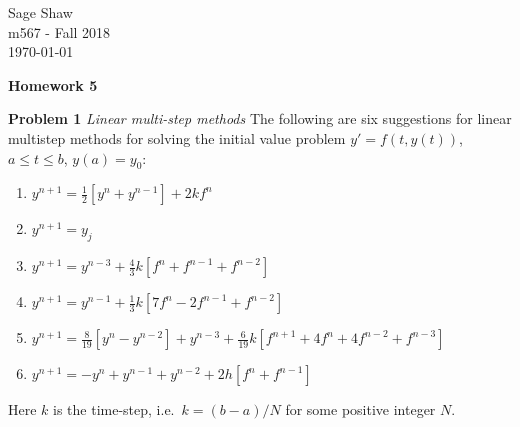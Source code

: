 \documentclass[12pt]{article}
\newcommand{\problem}[1]{\hspace{-4 ex} \large \textbf{Problem #1} }
\begin{document}
	\thispagestyle{empty}
	
	\begin{flushright}
		Sage Shaw \\
		m567 - Fall 2018 \\
		\today
	\end{flushright}
	
\begin{center}{\large \textbf{Homework 5}}\end{center}
\bigbreak

\hspace{-.5 ex}\problem{1} \emph{Linear multi-step methods} The following are six suggestions for linear multistep methods for solving
the initial value problem $y'=f(t,y(t))$, $a \leq t \leq b$, $y(a) = y_0$:
\begin{enumerate}[label=(\alph*)]
	\item $y^{n+1} = \frac{1}{2}\left[y^{n} + y^{n-1}\right] + 2kf^{n}$
	\item $y^{n+1} = y_j$
	\item $y^{n+1} = y^{n-3} + \frac{4}{3}k\left[f^{n} + f^{n-1} + f^{n-2}\right]$
	\item $y^{n+1} = y^{n-1} + \frac{1}{3}k\left[7f^{n} - 2f^{n-1} + f^{n-2}\right]$
	\item $y^{n+1} = \frac{8}{19}\left[y^{n} - y^{n-2}\right] + y^{n-3} + \frac{6}{19}k\left[f^{n+1} + 4f^{n} + 4f^{n-2} + f^{n-3}\right]$
	\item $y^{n+1} = -y^{n} + y^{n-1} + y^{n-2} + 2h\left[f^{n} + f^{n-1}\right]$
\end{enumerate}
Here $k$ is the time-step, i.e.\ $k=(b-a)/N$ for some positive integer $N$.
\end{document}
